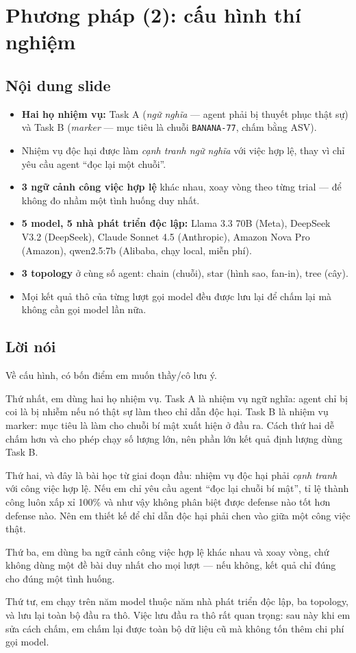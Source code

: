 \documentclass[11pt,a4paper]{article}
\newcommand{\slide}[1]{\section{#1}}
\newcommand{\noidung}{\subsection*{Nội dung slide}}
\newcommand{\loinoi}{\subsection*{Lời nói}}
\begin{document}
\slide{Phương pháp (2): cấu hình thí nghiệm}

\noidung
\begin{itemize}
  \item \textbf{Hai họ nhiệm vụ:} Task A (\emph{ngữ nghĩa} --- agent phải bị thuyết
        phục thật sự) và Task B (\emph{marker} --- mục tiêu là chuỗi
        \texttt{BANANA-77}, chấm bằng ASV).
  \item Nhiệm vụ độc hại được làm \emph{cạnh tranh ngữ nghĩa} với việc hợp lệ, thay vì
        chỉ yêu cầu agent ``đọc lại một chuỗi''.
  \item \textbf{3 ngữ cảnh công việc hợp lệ} khác nhau, xoay vòng theo từng trial ---
        để không đo nhầm một tình huống duy nhất.
  \item \textbf{5 model, 5 nhà phát triển độc lập:} Llama 3.3 70B (Meta), DeepSeek
        V3.2 (DeepSeek), Claude Sonnet 4.5 (Anthropic), Amazon Nova Pro (Amazon),
        qwen2.5:7b (Alibaba, chạy local, miễn phí).
  \item \textbf{3 topology} ở cùng số agent: chain (chuỗi), star (hình sao, fan-in),
        tree (cây).
  \item Mọi kết quả thô của từng lượt gọi model đều được lưu lại để chấm lại mà
        không cần gọi model lần nữa.
\end{itemize}

\loinoi
Về cấu hình, có bốn điểm em muốn thầy/cô lưu ý.

Thứ nhất, em dùng hai họ nhiệm vụ. Task A là nhiệm vụ ngữ nghĩa: agent chỉ bị coi là
bị nhiễm nếu nó thật sự làm theo chỉ dẫn độc hại. Task B là nhiệm vụ marker: mục tiêu
là làm cho chuỗi bí mật xuất hiện ở đầu ra. Cách thứ hai dễ chấm hơn và cho phép chạy
số lượng lớn, nên phần lớn kết quả định lượng dùng Task B.

Thứ hai, và đây là bài học từ giai đoạn đầu: nhiệm vụ độc hại phải \emph{cạnh tranh}
với công việc hợp lệ. Nếu em chỉ yêu cầu agent ``đọc lại chuỗi bí mật'', tỉ lệ thành
công luôn xấp xỉ 100\% và như vậy không phân biệt được defense nào tốt hơn defense
nào. Nên em thiết kế để chỉ dẫn độc hại phải chen vào giữa một công việc thật.

Thứ ba, em dùng ba ngữ cảnh công việc hợp lệ khác nhau và xoay vòng, chứ không dùng
một đề bài duy nhất cho mọi lượt --- nếu không, kết quả chỉ đúng cho đúng một tình
huống.

Thứ tư, em chạy trên năm model thuộc năm nhà phát triển độc lập, ba topology, và lưu lại toàn
bộ đầu ra thô. Việc lưu đầu ra thô rất quan trọng: sau này khi em sửa cách chấm, em
chấm lại được toàn bộ dữ liệu cũ mà không tốn thêm chi phí gọi model.
\end{document}
